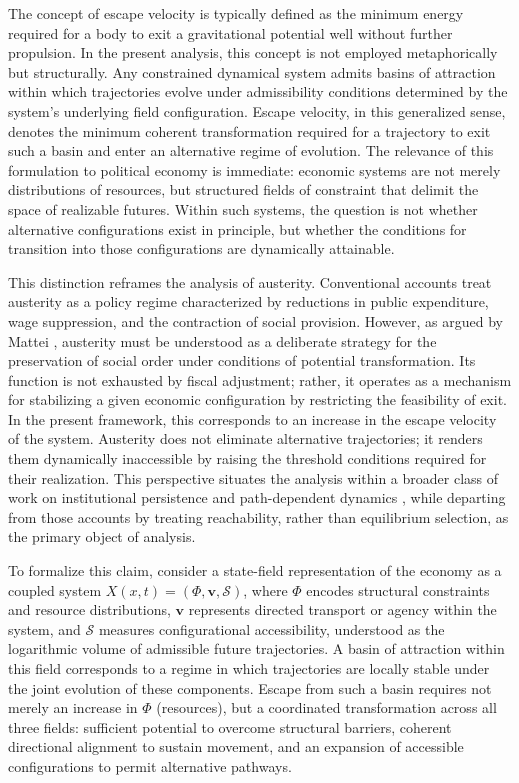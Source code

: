\documentclass[11pt, a4paper]{article}
\begin{document}
The concept of escape velocity is typically defined as the minimum energy required for a body to exit a gravitational potential well without further propulsion. In the present analysis, this concept is not employed metaphorically but structurally. Any constrained dynamical system admits basins of attraction within which trajectories evolve under admissibility conditions determined by the system's underlying field configuration. Escape velocity, in this generalized sense, denotes the minimum coherent transformation required for a trajectory to exit such a basin and enter an alternative regime of evolution. The relevance of this formulation to political economy is immediate: economic systems are not merely distributions of resources, but structured fields of constraint that delimit the space of realizable futures. Within such systems, the question is not whether alternative configurations exist in principle, but whether the conditions for transition into those configurations are dynamically attainable.

This distinction reframes the analysis of austerity. Conventional accounts treat austerity as a policy regime characterized by reductions in public expenditure, wage suppression, and the contraction of social provision. However, as argued by Mattei \cite{mattei2022}, austerity must be understood as a deliberate strategy for the preservation of social order under conditions of potential transformation. Its function is not exhausted by fiscal adjustment; rather, it operates as a mechanism for stabilizing a given economic configuration by restricting the feasibility of exit. In the present framework, this corresponds to an increase in the escape velocity of the system. Austerity does not eliminate alternative trajectories; it renders them dynamically inaccessible by raising the threshold conditions required for their realization. This perspective situates the analysis within a broader class of work on institutional persistence and path-dependent dynamics \cite{arthur1994,north1990}, while departing from those accounts by treating reachability, rather than equilibrium selection, as the primary object of analysis.

To formalize this claim, consider a state-field representation of the economy as a coupled system $X(x,t) = (\Phi, \mathbf{v}, \mathcal{S})$, where $\Phi$ encodes structural constraints and resource distributions, $\mathbf{v}$ represents directed transport or agency within the system, and $\mathcal{S}$ measures configurational accessibility, understood as the logarithmic volume of admissible future trajectories. A basin of attraction within this field corresponds to a regime in which trajectories are locally stable under the joint evolution of these components. Escape from such a basin requires not merely an increase in $\Phi$ (resources), but a coordinated transformation across all three fields: sufficient potential to overcome structural barriers, coherent directional alignment to sustain movement, and an expansion of accessible configurations to permit alternative pathways.
\end{document}
